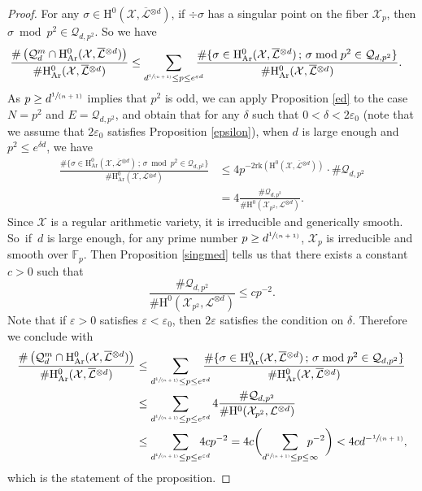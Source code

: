 \documentclass[JEP,XML,SOM,Unicode,published]{cedram}
\newcommand{\spfrac}[2]{\sfrac{#1}{(#2)}}
\let\epsilon\varepsilon
\newcommand{\sep}{\,;\,}
\theoremstyle{plain}
\theoremstyle{definition}
\newcommand{\ho}{\mathrm{H}}
\newcommand{\X}{\mathcal{X}}
\newcommand{\Li}{\overline{\mathcal{L}}{}}
\newcommand{\li}{\mathcal{L}}
\newcommand{\F}{\mathbb{F}}
\begin{document}
\begin{proof}
For any $\sigma\in\ho^0(\X,\Li^{\otimes d})$, if $\div\sigma$ has a singular point on the fiber $\X_p$, then $\sigma\bmod p^2\in \mathcal{Q}_{d, p^2}$. So we have
\begin{align*}
\frac{\#\left(\mathcal{Q}_d^{m}\cap \ho^0_{\mathrm{Ar}}(\X, \overline{\mathcal{L}}{}^{\otimes d})\right)}{\#\ho^0_{\mathrm{Ar}}(\X,\Li^{\otimes d})}
&\leq \sum_{d^{\spfrac{1}{n+1}}\leq p \leq e^{\varepsilon d}}\hspace*{-3mm} \frac{\#\{ \sigma\in \ho^0_{\mathrm{Ar}}(\X,\Li^{\otimes d})\sep \sigma\bmod p^2\in \mathcal{Q}_{d,p^2} \}}{\#\ho^0_{\mathrm{Ar}}(\X,\Li^{\otimes d})}.
\end{align*}
As $p\geq d^{\spfrac{1}{n+1}}$ implies that $p^2$ is odd, we can apply Proposition \ref{ed} to the case $N=p^2$ and $E=\mathcal{Q}_{d,p^2}$, and obtain that for any $\delta$ such that $0<\delta<2\varepsilon_0$ (note that we assume that $2\varepsilon_0$ satisfies Proposition \ref{epsilon}), when $d$ is large enough and $p^2\leq e^{\delta d}$, we have
\begin{align*}
\frac{\#\{ \sigma\in \ho^0_{\mathrm{Ar}}(\X,\Li^{\otimes d})\sep \sigma\bmod p^2\in \mathcal{Q}_{d,p^2} \}}{\#\ho^0_{\mathrm{Ar}}(\X,\Li^{\otimes d})}&\leq 4p^{-2\mathrm{rk}(\ho^0(\X,\Li^{\otimes d}))}\cdot \#\mathcal{Q}_{d,p^2} \\[-5pt]
&=4\frac{\#\mathcal{Q}_{d,p^2} }{\#\mathrm{H}^0(\X_{p^2}, \li^{\otimes d})}.
\end{align*}
Since $\X$ is a regular arithmetic variety, it is irreducible and generically smooth. So~if~$d$ is large enough, for any prime number $p\geq d^{\spfrac{1}{n+1}}$, $\X_p$ is irreducible and smooth over $\F_p$. Then Proposition \ref{singmed} tells us that there exists a constant $c>0$ such that
\[
\frac{\#\mathcal{Q}_{d,p^2} }{\#\mathrm{H}^0(\X_{p^2}, \li^{\otimes d})}\leq cp^{-2}.
\]
Note that if $\varepsilon>0$ satisfies $\varepsilon<\epsilon_0$, then $2\varepsilon$ satisfies the condition on $\delta$. Therefore we conclude with
\begin{align*}
\frac{\#\left(\mathcal{Q}_d^{m}\cap \ho^0_{\mathrm{Ar}}(\X, \overline{\mathcal{L}}{}^{\otimes d})\right)}{\#\ho^0_{\mathrm{Ar}}(\X,\Li^{\otimes d})} &\leq \sum_{d^{\spfrac{1}{n+1}}\leq p \leq e^{\varepsilon d}}\hspace*{-3mm} \frac{\#\{ \sigma\in \ho^0_{\mathrm{Ar}}(\X,\Li^{\otimes d})\sep \sigma\bmod p^2\in \mathcal{Q}_{d,p^2} \}}{\#\ho^0_{\mathrm{Ar}}(\X,\Li^{\otimes d})}\\
&\leq \sum_{d^{\spfrac{1}{n+1}}\leq p \leq e^{\varepsilon d}}4\frac{\#\mathcal{Q}_{d,p^2} }{\#\mathrm{H}^0(\X_{p^2}, \li^{\otimes d})} \\
&\leq \sum_{d^{\spfrac{1}{n+1}}\leq p \leq e^{\varepsilon d}} \hspace*{-4mm}4cp^{-2} = 4c\biggl(\sum_{d^{\spfrac{1}{n+1}}\leq p \leq \infty} \hspace*{-4mm}p^{-2}\biggr)< 4c d^{-\spfrac{1}{n+1}},
\end{align*}
which is the statement of the proposition.
\end{proof}
\end{document}
